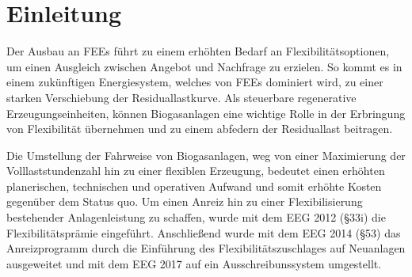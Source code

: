 \section{Einleitung}

Der Ausbau an \glspl{FEE} führt zu einem erhöhten Bedarf an Flexibilitätsoptionen, um einen Ausgleich zwischen Angebot und Nachfrage zu erzielen. So kommt es in einem zukünftigen Energiesystem, welches von \glspl{FEE} dominiert wird, zu einer starken Verschiebung der Residuallastkurve. Als steuerbare regenerative Erzeugungseinheiten, können Biogasanlagen eine wichtige Rolle in der Erbringung von Flexibilität übernehmen und zu einem abfedern der Residuallast beitragen. \parencite{ISE2013}\smallskip

Die Umstellung der Fahrweise von Biogasanlagen, weg von einer Maximierung der Volllaststundenzahl hin zu einer flexiblen Erzeugung, bedeutet einen erhöhten planerischen, technischen und operativen Aufwand und somit erhöhte Kosten gegenüber dem Status quo. Um einen Anreiz hin zu einer Flexibilisierung bestehender Anlagenleistung zu schaffen, wurde mit dem \gls{EEG} 2012 (\S 33i) die Flexibilitätsprämie eingeführt. Anschließend wurde mit dem \gls{EEG} 2014 (\S 53) das Anreizprogramm durch die Einführung des Flexibilitätszuschlages auf Neuanlagen ausgeweitet und mit dem \gls{EEG} 2017 auf ein Ausschreibunssystem umgestellt. \parencite{DanielGromke2019}

